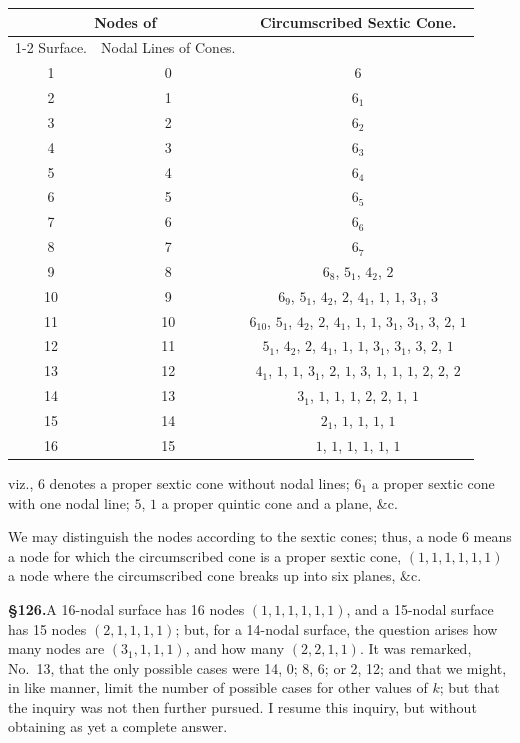 \documentclass[11pt,a4paper]{article}
\begin{document}
\begin{center}
\begin{tabular}{|c|c|c|}
\hline
\multicolumn{2}{|c|}{Nodes of} & Circumscribed Sextic Cone. \\
\cline{1-2}
Surface. & Nodal Lines of Cones. & \\
\hline
1 & 0 & $6$ \\
2 & 1 & $6_1$ \\
3 & 2 & $6_2$ \\
4 & 3 & $6_3$ \\
5 & 4 & $6_4$ \\
6 & 5 & $6_5$ \\
7 & 6 & $6_6$ \\
8 & 7 & $6_7$ \\
9 & 8 & $6_8$, $5_1$, $4_2$, $2$ \\
10 & 9 & $6_9$, $5_1$, $4_2$, $2$, $4_1$, $1$, $1$, $3_1$, $3$ \\
11 & 10 & $6_{10}$, $5_1$, $4_2$, $2$, $4_1$, $1$, $1$, $3_1$, $3_1$, $3$, $2$, $1$ \\
12 & 11 & $5_1$, $4_2$, $2$, $4_1$, $1$, $1$, $3_1$, $3_1$, $3$, $2$, $1$ \\
13 & 12 & $4_1$, $1$, $1$, $3_1$, $2$, $1$, $3$, $1$, $1$, $1$, $2$, $2$, $2$ \\
14 & 13 & $3_1$, $1$, $1$, $1$, $2$, $2$, $1$, $1$ \\
15 & 14 & $2_1$, $1$, $1$, $1$, $1$ \\
16 & 15 & $1$, $1$, $1$, $1$, $1$, $1$ \\
\hline
\end{tabular}
\end{center}

viz., $6$ denotes a proper sextic cone without nodal lines; $6_1$ a proper sextic cone with one nodal line; $5$, $1$ a proper quintic cone and a plane, \&c.

We may distinguish the nodes according to the sextic cones; thus, a node $6$ means a node for which the circumscribed cone is a proper sextic cone, $(1, 1, 1, 1, 1, 1)$ a node where the circumscribed cone breaks up into six planes, \&c.

\textbf{\S 126.}\quad A 16-nodal surface has 16 nodes $(1, 1, 1, 1, 1, 1)$, and a 15-nodal surface has 15 nodes $(2, 1, 1, 1, 1)$; but, for a 14-nodal surface, the question arises how many nodes are $(3_1, 1, 1, 1)$, and how many $(2, 2, 1, 1)$. It was remarked, No.~13, that the only possible cases were 14, 0; 8, 6; or 2, 12; and that we might, in like manner, limit the number of possible cases for other values of $k$; but that the inquiry was not then further pursued. I resume this inquiry, but without obtaining as yet a complete answer.
\end{document}
